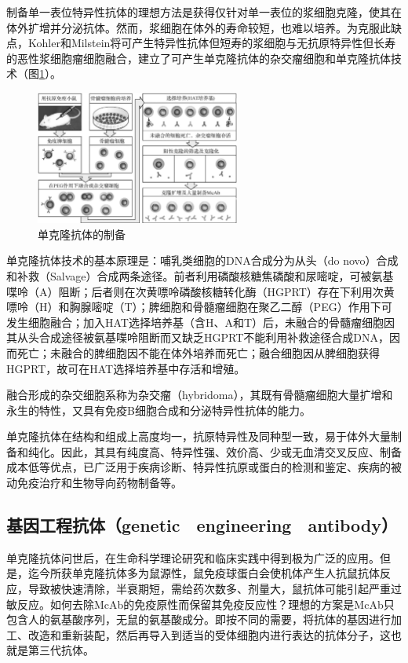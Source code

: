 制备单一表位特异性抗体的理想方法是获得仅针对单一表位的浆细胞克隆，使其在体外扩增并分泌抗体。然而，浆细胞在体外的寿命较短，也难以培养。为克服此缺点，Kohler和Milstein将可产生特异性抗体但短寿的浆细胞与无抗原特异性但长寿的恶性浆细胞瘤细胞融合，建立了可产生单克隆抗体的杂交瘤细胞和单克隆抗体技术（图\ref{fig4-13}）。

\begin{figure}[!htbp]
 \centering
 \includegraphics[width=0.6\textwidth]{./images/Image00073.jpg}
 \captionsetup{justification=centering}
 \caption{单克隆抗体的制备}
 \label{fig4-13}
  \end{figure} 

单克隆抗体技术的基本原理是：哺乳类细胞的DNA合成分为从头（do
novo）合成和补救（Salvage）合成两条途径。前者利用磷酸核糖焦磷酸和尿嘧啶，可被氨基喋呤（A）阻断；后者则在次黄嘌呤磷酸核糖转化酶（HGPRT）存在下利用次黄嘌呤（H）和胸腺嘧啶（T）；脾细胞和骨髓瘤细胞在聚乙二醇（PEG）作用下可发生细胞融合；加入HAT选择培养基（含H、A和T）后，未融合的骨髓瘤细胞因其从头合成途径被氨基喋呤阻断而又缺乏HGPRT不能利用补救途径合成DNA，因而死亡；未融合的脾细胞因不能在体外培养而死亡；融合细胞因从脾细胞获得HGPRT，故可在HAT选择培养基中存活和增殖。

融合形成的杂交细胞系称为杂交瘤（hybridoma），其既有骨髓瘤细胞大量扩增和永生的特性，又具有免疫B细胞合成和分泌特异性抗体的能力。

单克隆抗体在结构和组成上高度均一，抗原特异性及同种型一致，易于体外大量制备和纯化。因此，其具有纯度高、特异性强、效价高、少或无血清交叉反应、制备成本低等优点，已广泛用于疾病诊断、特异性抗原或蛋白的检测和鉴定、疾病的被动免疫治疗和生物导向药物制备等。


\subsection{基因工程抗体（genetic　engineering　antibody）}

单克隆抗体问世后，在生命科学理论研究和临床实践中得到极为广泛的应用。但是，迄今所获单克隆抗体多为鼠源性，鼠免疫球蛋白会使机体产生人抗鼠抗体反应，导致被快速清除，半衰期短，需给药次数多、剂量大，鼠抗体可能引起严重过敏反应。如何去除McAb的免疫原性而保留其免疫反应性？理想的方案是McAb只包含人的氨基酸序列，无鼠的氨基酸成分。即按不同的需要，将抗体的基因进行加工、改造和重新装配，然后再导入到适当的受体细胞内进行表达的抗体分子，这也就是第三代抗体。

